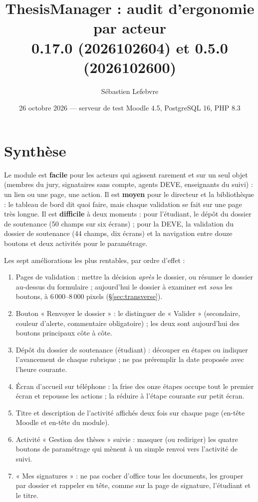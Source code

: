 \documentclass[11pt,a4paper]{article}
\title{ThesisManager : audit d'ergonomie par acteur\\
  \large \code{mod\_these} 0.17.0 (2026102604) et \code{mod\_thesesynthesis} 0.5.0 (2026102600)}
\author{Sébastien Lefebvre}
\date{26 octobre 2026 --- serveur de test Moodle 4.5, PostgreSQL 16, PHP 8.3}
\begin{document}
\maketitle

\section*{Synthèse}

Le module est \textbf{facile} pour les acteurs qui agissent rarement et sur un seul objet
(membres du jury, signataires sans compte, agents DEVE, enseignants du suivi) : un lien ou une
page, une action. Il est \textbf{moyen} pour le directeur et la bibliothèque : le tableau de bord
dit quoi faire, mais chaque validation se fait sur une page très longue. Il est
\textbf{difficile} à deux moments : pour l'étudiant, le dépôt du dossier de soutenance (50 champs
sur six écrans) ; pour la DEVE, la validation du dossier de soutenance (44 champs, dix écrans) et
la navigation entre douze boutons et deux activités pour le paramétrage.

Les sept améliorations les plus rentables, par ordre d'effet :

\begin{enumerate}
  \item Pages de validation : mettre la décision \emph{après} le dossier, ou résumer le dossier au-dessus
    du formulaire ; aujourd'hui le dossier à examiner est \emph{sous} les boutons, à 6\,000--8\,000 pixels
    (§\ref{sec:transverse}).
  \item Bouton « Renvoyer le dossier » : le distinguer de « Valider » (secondaire, couleur d'alerte,
    commentaire obligatoire) ; les deux sont aujourd'hui des boutons principaux côte à côte.
  \item Dépôt du dossier de soutenance (étudiant) : découper en étapes ou indiquer l'avancement de
    chaque rubrique ; ne pas préremplir la date proposée avec l'heure courante.
  \item Écran d'accueil sur téléphone : la frise des onze étapes occupe tout le premier écran et
    repousse les actions ; la réduire à l'étape courante sur petit écran.
  \item Titre et description de l'activité affichés deux fois sur chaque page (en-tête Moodle et
    en-tête du module).
  \item Activité « Gestion des thèses » suivie : masquer (ou rediriger) les quatre boutons de
    paramétrage qui mènent à un simple renvoi vers l'activité de suivi.
  \item « Mes signatures » : ne pas cocher d'office tous les documents, les grouper par dossier et
    rappeler en tête, comme sur la page de signature, l'étudiant et le titre.
\end{enumerate}
\end{document}
